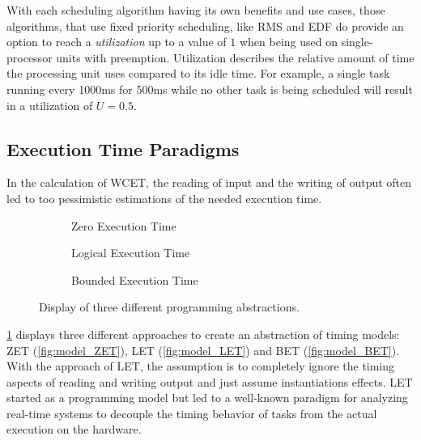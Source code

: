 With each scheduling algorithm having its own benefits and use cases, those algorithms, that use fixed priority scheduling, like \ac{RMS} and \ac{EDF} do provide an option to reach a \textit{utilization} up to a value of $1$ when being used on single-processor units with preemption\cite{liuSchedulingAlgorithmsMultiprogramming1973}.
Utilization describes the relative amount of time the processing unit uses compared to its idle time.
For example, a single task running every 1000ms for 500ms while no other task is being scheduled will result in a utilization of $U=0.5$.

\subsection{Execution Time Paradigms}\label{sec:let}
In the calculation of \ac{WCET}, the reading of input and the writing of output often led to too pessimistic estimations of the needed execution time.
\begin{figure}[t!]
	\begin{subfigure}[c]{0.32\textwidth}
		\resizebox{\textwidth}{!}{%
			\label{fig:model_ZET}
			
		}
		\caption{Zero Execution Time}
	\end{subfigure}
	\hfill
	\begin{subfigure}[c]{0.32\textwidth}
		\resizebox{\textwidth}{!}{%
			\label{fig:model_LET}
			
		}
		\caption{Logical Execution Time}
	\end{subfigure}
	\hfill
	\begin{subfigure}[c]{0.32\textwidth}
		\resizebox{\textwidth}{!}{%
			\label{fig:model_BET}
			
		}
		\caption{Bounded Execution Time}
	\end{subfigure}
	\caption{Display of three different programming abstractions\cite{chakrabortyAdvancesRealTimeSystems2012}.}
	\label{fig:model_ZET_LET_BET}
\end{figure}
\cref{fig:model_ZET_LET_BET} displays three different approaches to create an abstraction of timing models: \ac{ZET} (\cref{fig:model_ZET}), \ac{LET} (\cref{fig:model_LET}) and \ac{BET} (\cref{fig:model_BET}).
With the approach of \ac{LET}, the assumption is to completely ignore the timing aspects of reading and writing output and just assume instantiations effects\cite{chakrabortyAdvancesRealTimeSystems2012}.
\ac{LET} started as a programming model but led to a well-known paradigm for analyzing real-time systems to decouple the timing behavior of tasks from the actual execution on the hardware. \
